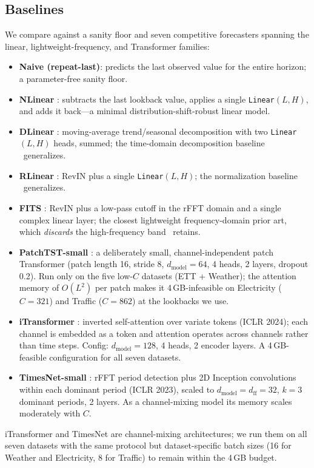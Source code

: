 \subsection{Baselines}
\label{sec:exp:baselines}

We compare against a sanity floor and seven competitive forecasters spanning the
linear, lightweight-frequency, and Transformer families:
\begin{itemize}
  \item \textbf{Naive (repeat-last)}: predicts the last observed value for the
        entire horizon; a parameter-free sanity floor.
  \item \textbf{NLinear} \citep{zeng2023dlinear}: subtracts the last lookback
        value, applies a single \texttt{Linear}$(L,H)$, and adds it back---a
        minimal distribution-shift-robust linear model.
  \item \textbf{DLinear} \citep{zeng2023dlinear}: moving-average trend/seasonal
        decomposition with two \texttt{Linear}$(L,H)$ heads, summed; the
        time-domain decomposition baseline \method\ generalizes.
  \item \textbf{RLinear} \citep{li2023rlinear}: RevIN \citep{kim2022revin} plus a
        single \texttt{Linear}$(L,H)$; the normalization baseline \arevin\
        generalizes.
  \item \textbf{FITS} \citep{xu2024fits}: RevIN plus a low-pass cutoff in the
        rFFT domain and a single complex linear layer; the closest lightweight
        frequency-domain prior art, which \emph{discards} the high-frequency band
        \method\ retains.
  \item \textbf{PatchTST-small} \citep{nie2023patchtst}: a deliberately small,
        channel-independent patch Transformer (patch length 16, stride 8,
        $d_{\text{model}}{=}64$, 4 heads, 2 layers, dropout 0.2). Run only on
        the five low-$C$ datasets (ETT + Weather); the attention memory of
        $O(L^{2})$ per patch makes it 4\,GB-infeasible on Electricity ($C{=}321$)
        and Traffic ($C{=}862$) at the lookbacks we use.
  \item \textbf{iTransformer} \citep{liu2024itransformer}: inverted self-attention
        over variate tokens (ICLR 2024); each channel is embedded as a token and
        attention operates across channels rather than time steps. Config:
        $d_{\text{model}}{=}128$, 4 heads, 2 encoder layers. A 4\,GB-feasible
        configuration for all seven datasets.
  \item \textbf{TimesNet-small} \citep{wu2023timesnet}: rFFT period detection plus
        2D Inception convolutions within each dominant period (ICLR 2023), scaled
        to $d_{\text{model}}{=}d_{\text{ff}}{=}32$, $k{=}3$ dominant periods,
        2 layers. As a channel-mixing model its memory scales moderately with $C$.
\end{itemize}
iTransformer and TimesNet are channel-mixing architectures; we run them on all
seven datasets with the same protocol but dataset-specific batch sizes (16 for
Weather and Electricity, 8 for Traffic) to remain within the 4\,GB budget.

